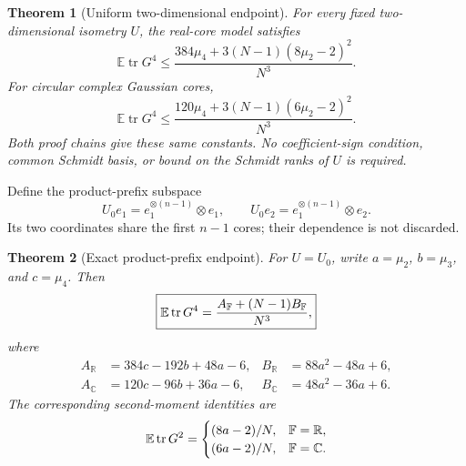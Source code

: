 \documentclass[11pt]{article}
\numberwithin{equation}{section}
\newtheorem{theorem}{Theorem}[section]
\theoremstyle{definition}\newtheorem{definition}[theorem]{Definition}
\theoremstyle{remark}\newtheorem{remark}[theorem]{Remark}
\newcommand{\R}{\mathbb R}\newcommand{\E}{\mathbb E}\newcommand{\Prob}{\mathbb P}
\newcommand{\tr}{\operatorname{tr}}\newcommand{\Ent}{\operatorname{Ent}}
\newcommand{\C}{\mathbb C}
\begin{document}
\begin{theorem}[Uniform two-dimensional endpoint]\label{thm:uniform}
For every fixed two-dimensional isometry $U$, the real-core model satisfies
\begin{equation}\label{eq:uniformR}
 \boxed{\displaystyle
 \E\tr G^4\le
 \frac{384\mu_4+3(N-1)(8\mu_2-2)^2}{N^3}.}
\end{equation}
For circular complex Gaussian cores,
\begin{equation}\label{eq:uniformC}
 \boxed{\displaystyle
 \E\tr G^4\le
 \frac{120\mu_4+3(N-1)(6\mu_2-2)^2}{N^3}.}
\end{equation}
Both proof chains give these same constants. No coefficient-sign condition,
common Schmidt basis, or bound on the Schmidt ranks of $U$ is required.
\end{theorem}

Define the product-prefix subspace
\begin{equation}\label{eq:prefixU}
 U_0e_1=e_1^{\otimes(n-1)}\otimes e_1,\qquad
 U_0e_2=e_1^{\otimes(n-1)}\otimes e_2.
\end{equation}
Its two coordinates share the first $n-1$ cores; their dependence is not discarded.

\begin{theorem}[Exact product-prefix endpoint]\label{thm:exact}
For $U=U_0$, write $a=\mu_2$, $b=\mu_3$, and $c=\mu_4$. Then
\begin{equation}\label{eq:exact}
 \boxed{\displaystyle\E\tr G^4=\frac{A_{\F}+(N-1)B_{\F}}{N^3},}
\end{equation}
where
\begin{align}
 A_{\R}&=384c-192b+48a-6,
 &B_{\R}&=88a^2-48a+6,\label{eq:ABR}\\
 A_{\C}&=120c-96b+36a-6,
 &B_{\C}&=48a^2-36a+6.\label{eq:ABC}
\end{align}
The corresponding second-moment identities are
\begin{equation}\label{eq:second}
 \E\tr G^2=\begin{cases}(8a-2)/N,&\F=\R,\\(6a-2)/N,&\F=\C.\end{cases}
\end{equation}
\end{theorem}
\end{document}

